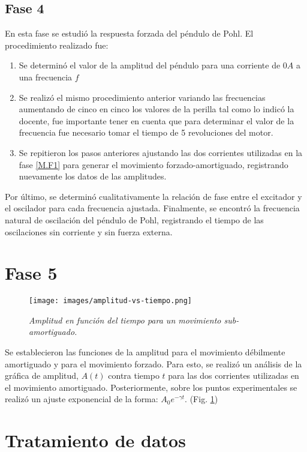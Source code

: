 \documentclass[spanish,notitlepage,letterpaper, 12pt]{article}
\begin{document}
\subsection{Fase 4}
En esta fase se estudió la respuesta forzada del péndulo de Pohl. El procedimiento realizado fue:
\begin{enumerate}
    \item Se determinó el valor de la amplitud del
péndulo para una corriente de $0A$ a una frecuencia $f$ 
    \item Se realizó el mismo procedimiento anterior variando las frecuencias aumentando de cinco en cinco los valores de la perilla tal como lo indicó la docente, fue importante tener en cuenta que para determinar el valor de la frecuencia fue necesario tomar el tiempo de 5 revoluciones del motor. 
    \item Se repitieron los pasos anteriores ajustando las dos corrientes utilizadas en la fase \ref{M.F1} para generar el movimiento forzado-amortiguado,
registrando nuevamente los datos de las amplitudes.
\end{enumerate}
Por último, se determinó cualitativamente la relación de fase entre el excitador y el
oscilador para cada frecuencia ajustada. Finalmente, se encontró la frecuencia natural
de oscilación del péndulo de Pohl, registrando el tiempo de las oscilaciones sin corriente y
sin fuerza externa.
\newpage
\section{Fase 5}
\begin{figure}[ht]
    \centering
    \texttt{[image: images/amplitud-vs-tiempo.png]}
    \caption{\textit{Amplitud en función del tiempo para un movimiento sub-amortiguado.}}
    \label{fig:2}
\end{figure}

Se establecieron las funciones de la amplitud para el movimiento
débilmente amortiguado y para el movimiento forzado. Para esto, se realizó un análisis
de la gráfica de amplitud, $A(t)$ contra tiempo $t$ para las dos
corrientes utilizadas en el movimiento amortiguado. Posteriormente, sobre los puntos
experimentales se realizó un ajuste exponencial de la forma: $A_0e^{-\gamma t}$. (Fig. \ref{fig:2})
\newpage
\section{Tratamiento de datos} \label{TD}
\end{document}
